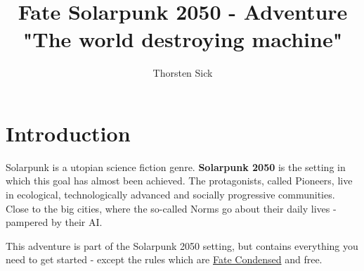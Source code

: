 \documentclass{book}
\title{Fate Solarpunk 2050 - Adventure "The world destroying machine"}
\author{Thorsten Sick}
\begin{document}
%
%
\mbox{}
\thispagestyle{empty}
\BgThispage



\chapter{Introduction}

Solarpunk is a utopian science fiction genre. \textbf{Solarpunk 2050} is the setting in which this goal has almost been achieved. The protagonists, called Pioneers, live in ecological, technologically advanced and socially progressive communities. Close to the big cities, where the so-called Norms go about their daily lives - pampered by their AI.

This adventure is part of the Solarpunk 2050 setting, but contains everything you need to get started - except the rules which are \href{https://fate-srd.com/fate-condensed}{Fate Condensed} and free.






\end{document}
